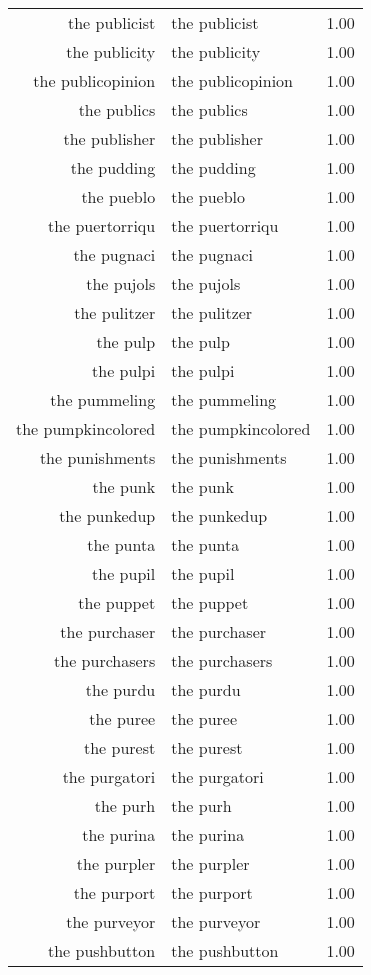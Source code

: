 \begin{table}[ht]
\begin{tabular}{rlr}
  the publicist & the publicist & 1.00 \\ 
  the publicity & the publicity & 1.00 \\ 
  the publicopinion & the publicopinion & 1.00 \\ 
  the publics & the publics & 1.00 \\ 
  the publisher & the publisher & 1.00 \\ 
  the pudding & the pudding & 1.00 \\ 
  the pueblo & the pueblo & 1.00 \\ 
  the puertorriqu & the puertorriqu & 1.00 \\ 
  the pugnaci & the pugnaci & 1.00 \\ 
  the pujols & the pujols & 1.00 \\ 
  the pulitzer & the pulitzer & 1.00 \\ 
  the pulp & the pulp & 1.00 \\ 
  the pulpi & the pulpi & 1.00 \\ 
  the pummeling & the pummeling & 1.00 \\ 
  the pumpkincolored & the pumpkincolored & 1.00 \\ 
  the punishments & the punishments & 1.00 \\ 
  the punk & the punk & 1.00 \\ 
  the punkedup & the punkedup & 1.00 \\ 
  the punta & the punta & 1.00 \\ 
  the pupil & the pupil & 1.00 \\ 
  the puppet & the puppet & 1.00 \\ 
  the purchaser & the purchaser & 1.00 \\ 
  the purchasers & the purchasers & 1.00 \\ 
  the purdu & the purdu & 1.00 \\ 
  the puree & the puree & 1.00 \\ 
  the purest & the purest & 1.00 \\ 
  the purgatori & the purgatori & 1.00 \\ 
  the purh & the purh & 1.00 \\ 
  the purina & the purina & 1.00 \\ 
  the purpler & the purpler & 1.00 \\ 
  the purport & the purport & 1.00 \\ 
  the purveyor & the purveyor & 1.00 \\ 
  the pushbutton & the pushbutton & 1.00 \\ 

\end{tabular}
\end{table}
